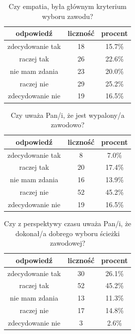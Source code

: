 \documentclass[a4paper,12pt,twoside,openany]{report}
\begin{document}
\begin{table}[h]
\caption{Czy empatia, była głównym kryterium wyboru zawodu?}
\centering
\begin{tabular}{ | c | c | c |}
\hline
odpowiedź & liczność & procent\\
\hline
zdecydowanie tak  &  18  & 15.7\% \\
\hline
raczej tak  &  26  & 22.6\% \\
\hline
nie mam zdania  &  23  & 20.0\% \\
\hline
raczej nie  &  29  & 25.2\% \\
\hline
zdecydowanie nie  &  19  & 16.5\% \\
\hline
\end{tabular}
\label{tab:Q34}
\end{table}



\begin{table}[h]
\caption{Czy uważa Pan/i, że jest wypalony/a zawodowo?}
\centering
\begin{tabular}{ | c | c | c |}
\hline
odpowiedź & liczność & procent\\
\hline
zdecydowanie tak  &  8  & 7.0\% \\
\hline
raczej tak  &  20  & 17.4\% \\
\hline
nie mam zdania  &  16  & 13.9\% \\
\hline
raczej nie  &  52  & 45.2\% \\
\hline
zdecydowanie nie  &  19  & 16.5\% \\
\hline
\end{tabular}
\label{tab:Q35}
\end{table}



\begin{table}[h]
\caption{Czy z perspektywy czasu uważa Pan/i, że dokonał/a dobrego wyboru ścieżki zawodowej?}
\centering
\begin{tabular}{ | c | c | c |}
\hline
odpowiedź & liczność & procent\\
\hline
zdecydowanie tak  &  30  & 26.1\% \\
\hline
raczej tak  &  52  & 45.2\% \\
\hline
nie mam zdania  &  13  & 11.3\% \\
\hline
raczej nie  &  17  & 14.8\% \\
\hline
zdecydowanie nie  &  3  & 2.6\% \\
\hline
\end{tabular}
\label{tab:Q36}
\end{table}
\end{document}
